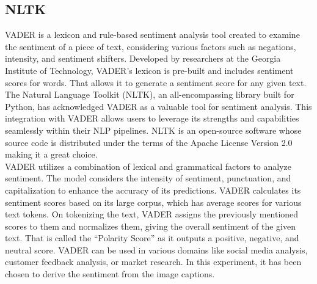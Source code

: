 \documentclass[conference]{IEEEtran}
\begin{document}
\subsection{NLTK}
{
VADER \cite{hutto2014vader} is a lexicon and rule-based sentiment analysis tool created to examine the sentiment of a piece of text, considering various factors such as negations, intensity, and sentiment shifters. Developed by researchers at the Georgia Institute of Technology, VADER's lexicon is pre-built and includes sentiment scores for words. That allows it to generate a sentiment score for any given text.
The Natural Language Toolkit (NLTK), an all-encompassing library built for Python, has acknowledged VADER as a valuable tool for sentiment analysis. This integration with VADER allows users to leverage its strengths and capabilities seamlessly within their NLP pipelines. NLTK is an open-source software whose source code is distributed under the terms of the Apache License Version 2.0 making it a great choice.
\\

VADER utilizes a combination of lexical and grammatical factors to analyze sentiment. The model considers the intensity of sentiment, punctuation, and capitalization to enhance the accuracy of its predictions. VADER calculates its sentiment scores based on its large corpus, which has average scores for various text tokens. On tokenizing the text, VADER assigns the previously mentioned scores to them and normalizes them, giving the overall sentiment of the given text. That is called the ``Polarity Score'' as it outputs a positive, negative, and neutral score.
VADER can be used in various domains like social media analysis, customer feedback analysis, or market research. In this experiment, it has been chosen to derive the sentiment from the image captions.
}
\end{document}
